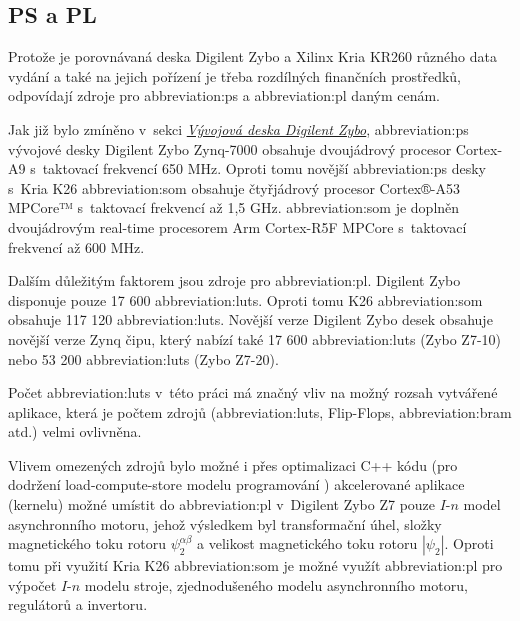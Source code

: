 \documentclass[a4paper, twoside, 11pt]{article}
\begin{document}
			\subsection{PS a PL}\label{subsec:ps-a-pl}
					Protože je porovnávaná deska Digilent Zybo a Xilinx Kria KR260 různého data vydání a také na jejich pořízení je třeba rozdílných finančních prostředků, odpovídají zdroje pro \gls{abbreviation:ps} a \gls{abbreviation:pl} daným cenám.\par
					Jak již bylo zmíněno v~sekci \hyperref[sec:vyvojova-deska-digilent-zybo]{\textit{Vývojová deska Digilent Zybo}}, \gls{abbreviation:ps} vývojové desky Digilent Zybo Zynq-7000 obsahuje dvoujádrový procesor Cortex-A9 s~taktovací frekvencí 650 MHz. Oproti tomu novější \gls{abbreviation:ps} desky s~Kria K26 \gls{abbreviation:som} obsahuje čtyřjádrový procesor Cortex®-A53 MPCore™ s~taktovací frekvencí až 1,5 GHz. \gls{abbreviation:som} je doplněn dvoujádrovým real-time procesorem Arm Cortex-R5F MPCore s~taktovací frekvencí až 600 MHz. \cite{digilent-zybo-reference-manual} \cite{kria-k26-som-ds}\par
					Dalším důležitým faktorem jsou zdroje pro \gls{abbreviation:pl}. Digilent Zybo disponuje pouze 17 600 \gls{abbreviation:luts}. Oproti tomu K26 \gls{abbreviation:som} obsahuje 117 120 \gls{abbreviation:luts}. Novější verze Digilent Zybo desek obsahuje novější verze Zynq čipu, který nabízí také 17 600 \gls{abbreviation:luts} (Zybo Z7-10) nebo 53 200 \gls{abbreviation:luts} (Zybo Z7-20). \cite{digilent-zybo-reference-manual} \cite{kria-k26-som-ds}\par
					Počet \gls{abbreviation:luts} v~této práci má značný vliv na možný rozsah vytvářené aplikace, která je počtem zdrojů (\gls{abbreviation:luts}, Flip-Flops, \gls{abbreviation:bram} atd.) velmi ovlivněna.\par
					Vlivem omezených zdrojů bylo možné i přes optimalizaci C++ kódu (pro dodržení load-compute-store modelu programování \cite{vitis-unified-software-platform-documentation-2022}) akcelerované aplikace (kernelu) možné umístit do \gls{abbreviation:pl} v~Digilent Zybo Z7 pouze $I$-$n$ model asynchronního motoru, jehož výsledkem byl transformační úhel, složky magnetického toku rotoru $\psi_2^{\alpha \beta}$ a velikost magnetického toku rotoru $| \psi_2 |$. Oproti tomu při využití Kria K26 \gls{abbreviation:som} je možné využít \gls{abbreviation:pl} pro výpočet $I$-$n$ modelu stroje, zjednodušeného modelu asynchronního motoru, regulátorů a invertoru.
\end{document}
